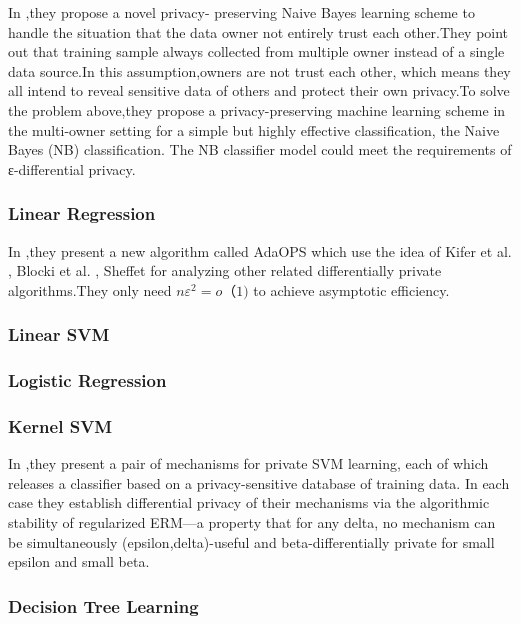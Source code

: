 \documentclass[10pt,conference]{IEEEtran}
\begin{document}
In \cite{Li2018Differentially},they propose a novel privacy- preserving Naive Bayes learning scheme to handle the situation that the data owner not entirely trust each other.They point out that training sample always collected from multiple owner instead of a single data source.In this assumption,owners are not trust each other, which means they all intend to reveal sensitive data of others and protect their own privacy.To solve the problem above,they propose a privacy-preserving machine learning scheme in the multi-owner setting for a simple but highly effective classification, the Naive Bayes (NB) classification. The NB classifier model could meet the requirements of ε-differential privacy.

\subsubsection{Linear Regression}

In \cite{Wang2017Per},they present a new algorithm called AdaOPS which use the idea of Kifer et al. \cite{Kifer2013Private}, Blocki et al. \cite{Kenthapadi2012Privacy}, Sheffet \cite{Sheffet2015Differentially} for analyzing other related differentially private algorithms.They only need $n\varepsilon ^{2}=o（1)$ to achieve asymptotic efficiency.


\subsubsection{Linear SVM}

\subsubsection{Logistic Regression}

\subsubsection{Kernel SVM}
In \cite{Rubinstein2009Learning},they present a pair of mechanisms for private SVM learning, each of which releases a classifier based on a privacy-sensitive database of training data. In each case they establish differential privacy of their mechanisms via the algorithmic stability of regularized ERM—a property that  for any delta, no mechanism can be simultaneously (epsilon,delta)-useful and beta-differentially private for small epsilon and small beta.


\subsubsection{Decision Tree Learning}
\cite{Fletcher2016Decision}
\end{document}
